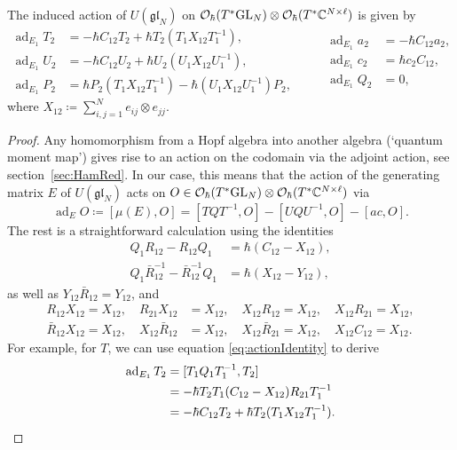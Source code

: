 \begin{lemma}\label{lemma:action}
The induced action of $U(\mathfrak{gl}_N)$ on $\mathcal{O}_\hbar(T^* \mathrm{GL}_N) \otimes \mathcal{O}_\hbar(T^* \mathbb{C}^{N \times \ell})$ is given by
\begin{equation}
\begin{aligned}
\operatorname{ad}_{E_1} T_2
&= -\hbar C_{12} T_2 + \hbar T_2 (T_1 X_{12} T_1^{-1}), \\
\operatorname{ad}_{E_1} U_2
&= -\hbar C_{12} U_2 + \hbar U_2 (U_1 X_{12} U_1^{-1}), \\
\operatorname{ad}_{E_1} P_2
&= \hbar P_2 (T_1 X_{12} T_1^{-1}) - \hbar (U_1 X_{12} U_1^{-1}) P_2,
\end{aligned}
\qquad
\begin{aligned}
\operatorname{ad}_{E_1} a_2 &= -\hbar C_{12} a_2, \\
\operatorname{ad}_{E_1} c_2 &= \hbar c_2 C_{12}, \\
\operatorname{ad}_{E_1} Q_2 &= 0,
\end{aligned}
\end{equation}
where $X_{12} \coloneq \sum_{i,j=1}^N e_{ij} \otimes e_{jj}$.
\end{lemma}

\begin{proof}
Any homomorphism from a Hopf algebra into another algebra (`quantum moment map') gives rise to an action on the codomain via the adjoint action, see section~\ref{sec:HamRed}. In our case, this means that the action of the generating matrix $E$ of $U(\mathfrak{gl}_N)$ acts on $O \in \mathcal{O}_\hbar(T^* \mathrm{GL}_N) \otimes \mathcal{O}_\hbar(T^* \mathbb{C}^{N \times \ell})$ via
\begin{equation*}
\operatorname{ad}_E O \coloneq [\mu(E),O] = [TQT^{-1},O]-[UQU^{-1},O]-[ac,O].
\end{equation*}
The rest is a straightforward calculation using the identities
\begin{align}\label{eq:actionIdentity}
Q_1 R_{12}-R_{12} Q_1 &= \hbar (C_{12}-X_{12}), \\
Q_1 \bar R_{12}^{-1} - \bar R_{12}^{-1} Q_1 &= \hbar (X_{12}-Y_{12}),
\end{align}
as well as $Y_{12} \bar R_{12} = Y_{12}$, and
\begin{align*}
R_{12} X_{12} = X_{12}, \quad R_{21} X_{12} &= X_{12}, \quad X_{12} R_{12} = X_{12}, \quad X_{12} R_{21} = X_{12}, \\
\bar R_{12} X_{12} = X_{12}, \quad X_{12} \bar R_{12} &= X_{12}, \quad X_{12} \bar R_{21} = X_{12}, \quad X_{12} C_{12} = X_{12}.
\end{align*}
For example, for $T$, we can use equation \eqref{eq:actionIdentity} to derive
\begin{align*}
\operatorname{ad}_{E_1} T_2
&= [T_1 Q_1 T_1^{-1},T_2] \\
&= -\hbar T_2 T_1 (C_{12}-X_{12}) R_{21} T_1^{-1} \\
&= -\hbar C_{12} T_2 + \hbar T_2 (T_1 X_{12} T_1^{-1}).
\qedhere
\end{align*}
\end{proof}

